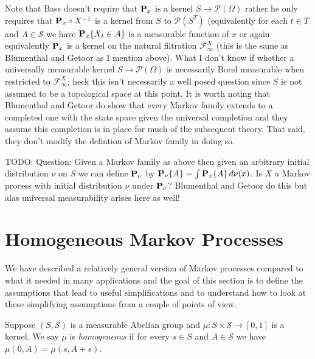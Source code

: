 Note that Bass doesn't require that $\probabilityop_x$ is a kernel $S
\to \mathcal{P}(\Omega)$ rather he only requires that
$\pushforward{X}{\probabilityop_x}$ is a kernel from $S$ to
$\mathcal{P}(S^T)$ (equivalently for each $t \in T$ and $A \in \mathcal{S}$ we have
$\sprobability{X_t \in A}{x}$ is a measurable function of $x$ or again
equivalently $\probabilityop_x$ is a kernel on the natural filtration
$\mathcal{F}^X_\infty$ (this is the same as Blumenthal and Getoor as I mention above).  What I don't know if whether a universally
measurable kernel $S \to  \mathcal{P}(\Omega)$ is necessarily Borel
measurable when restricted to $\mathcal{F}^X_\infty$; heck this isn't necessarily a well posed question since $S$ is not assumed to be
a topological space at this point.  It is worth noting that Blumenthal and Getoor do show that every Markov family extends to a completed one with 
the state space given the universal completion and they assume this completion is in place for much of the subsequent theory.  That said, they
don't modify the defintion of Markov family in doing so.

TODO: Question:  Given a Markov family as above then given an arbitrary
initial distribution $\nu$ on $S$ we can define $\probabilityop_\nu$
by $\sprobability{A}{\nu} = \int \sprobability{A}{x} \, d\nu(x)$.  Is
$X$ a Markov process with initial distribution $\nu$ under
$\probabilityop_\nu$?  Blumenthal and Getoor do this but alas universal measurability arises here as well!

\section{Homogeneous Markov Processes}

We have described a relatively general version of Markov processes
compared to what it needed in many applications and the goal of this
section is to define the assumptions that lead to useful
simplifications and to understand how to look at these simplifying
assumptions from a couple of points of view.

\begin{defn}Suppose $(S, \mathcal{S})$ is a measurable Abelian group
  and $\mu : S \times \mathcal{S} \to [0,1]$ is a kernel.  We say
  $\mu$ is \emph{homogeneous} if for every $s \in S$ and
  $A\in \mathcal{S}$ we have $\mu(0, A) = \mu(s, A+s)$.
\end{defn}

